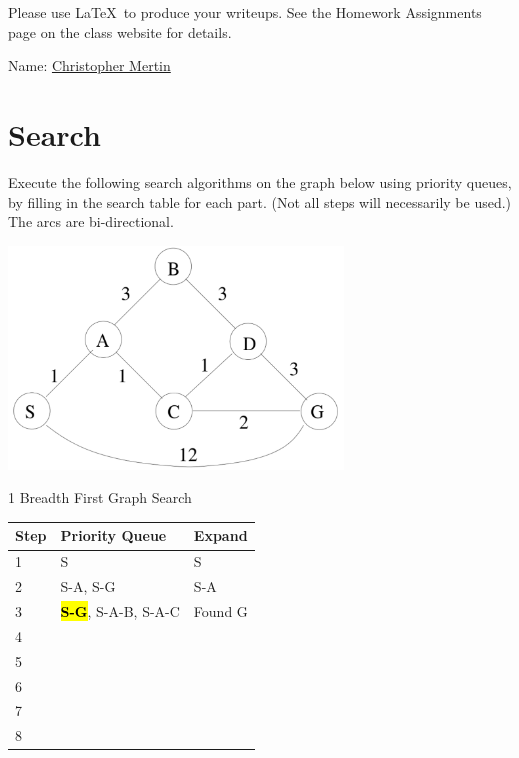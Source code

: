 \documentclass[11pt]{article}
\begin{document}
\thispagestyle{empty}

\renewcommand{\arraystretch}{1.5}


Please use \LaTeX\ to produce your writeups. See the Homework Assignments 
page on the class website for details.

\begin{flushleft}
Name: \underline{Christopher Mertin}
\end{flushleft}

\section{Search}

Execute the following search algorithms on the graph below using
priority queues, by filling in the search table for each part.  (Not
all steps will necessarily be used.)  The arcs are bi-directional.

  \begin{center}
  \centerline{\includegraphics[width=3.5in]{diagram.pdf}}
  \end{center}

  \begin{description}

  \item[1 Breadth First Graph Search]

  \end{description}

    \begin{center}
    \begin{tabular}{|l|l|l|} \hline
    \bf Step & \bf Priority Queue  & \bf Expand \\ \hline
    1 & S & S \\ \hline
    2 & S-A, S-G & S-A\\ \hline
    3 & \textcolor{red}{\textbf{\hl{S-G}}}, S-A-B, S-A-C&  Found G\\ \hline
    4 & & \\ \hline
    5 & &  \\ \hline
    6 &  &  \\ \hline
    7 &   &  \\ \hline
    8 &   &  \\ \hline
    \end{tabular}
    \end{center}
\end{document}
